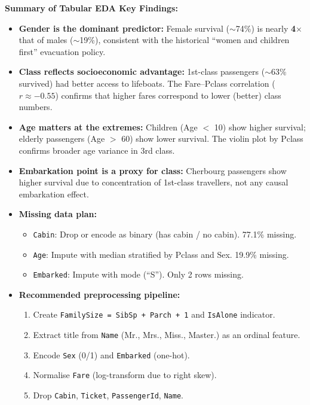 \documentclass[twoside]{hcmut-report}
\begin{document}
\begin{importantbox}
\textbf{Summary of Tabular EDA Key Findings:}
\begin{itemize}
    \item \textbf{Gender is the dominant predictor:} Female survival ($\sim$74\%) is nearly \textbf{4$\times$} that of males ($\sim$19\%), consistent with the historical ``women and children first'' evacuation policy.
    \item \textbf{Class reflects socioeconomic advantage:} 1st-class passengers ($\sim$63\% survived) had better access to lifeboats. The Fare--Pclass correlation ($r \approx -0.55$) confirms that higher fares correspond to lower (better) class numbers.
    \item \textbf{Age matters at the extremes:} Children (Age $<$ 10) show higher survival; elderly passengers (Age $>$ 60) show lower survival. The violin plot by Pclass confirms broader age variance in 3rd class.
    \item \textbf{Embarkation point is a proxy for class:} Cherbourg passengers show higher survival due to concentration of 1st-class travellers, not any causal embarkation effect.
    \item \textbf{Missing data plan:}
    \begin{itemize}
        \item \texttt{Cabin}: Drop or encode as binary (has cabin / no cabin). 77.1\% missing.
        \item \texttt{Age}: Impute with median stratified by Pclass and Sex. 19.9\% missing.
        \item \texttt{Embarked}: Impute with mode (``S''). Only 2 rows missing.
    \end{itemize}
    \item \textbf{Recommended preprocessing pipeline:}
    \begin{enumerate}
        \item Create \texttt{FamilySize = SibSp + Parch + 1} and \texttt{IsAlone} indicator.
        \item Extract title from \texttt{Name} (Mr., Mrs., Miss., Master.) as an ordinal feature.
        \item Encode \texttt{Sex} (0/1) and \texttt{Embarked} (one-hot).
        \item Normalise \texttt{Fare} (log-transform due to right skew).
        \item Drop \texttt{Cabin}, \texttt{Ticket}, \texttt{PassengerId}, \texttt{Name}.
    \end{enumerate}
\end{itemize}
\end{importantbox}
\end{document}
